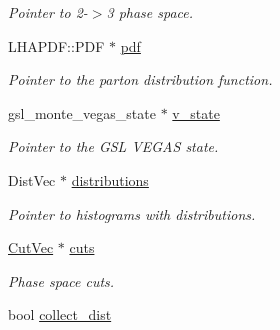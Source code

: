 \begin{DoxyCompactItemize}
\begin{DoxyCompactList}\small\item\em Pointer to 2-\/$>$3 phase space. \end{DoxyCompactList}\item 
\hypertarget{classintegrand__par_a082dc10e0e72baedade3f46cfffa4c15}{}L\+H\+A\+P\+D\+F\+::\+P\+D\+F $\ast$ \hyperlink{classintegrand__par_a082dc10e0e72baedade3f46cfffa4c15}{pdf}\label{classintegrand__par_a082dc10e0e72baedade3f46cfffa4c15}

\begin{DoxyCompactList}\small\item\em Pointer to the parton distribution function. \end{DoxyCompactList}\item 
\hypertarget{classintegrand__par_a3b5e2c8a2f3c33f0ebc594fd8f42210e}{}gsl\+\_\+monte\+\_\+vegas\+\_\+state $\ast$ \hyperlink{classintegrand__par_a3b5e2c8a2f3c33f0ebc594fd8f42210e}{v\+\_\+state}\label{classintegrand__par_a3b5e2c8a2f3c33f0ebc594fd8f42210e}

\begin{DoxyCompactList}\small\item\em Pointer to the G\+S\+L V\+E\+G\+A\+S state. \end{DoxyCompactList}\item 
\hypertarget{classintegrand__par_acd322d49688d798e5f71eb9ea63a4d46}{}Dist\+Vec $\ast$ \hyperlink{classintegrand__par_acd322d49688d798e5f71eb9ea63a4d46}{distributions}\label{classintegrand__par_acd322d49688d798e5f71eb9ea63a4d46}

\begin{DoxyCompactList}\small\item\em Pointer to histograms with distributions. \end{DoxyCompactList}\item 
\hypertarget{classintegrand__par_abb97a8b27b46a93b15bcf175c2309b55}{}\hyperlink{Cuts_8h_a61e538752de0e89c62ff420ec568e582}{Cut\+Vec} $\ast$ \hyperlink{classintegrand__par_abb97a8b27b46a93b15bcf175c2309b55}{cuts}\label{classintegrand__par_abb97a8b27b46a93b15bcf175c2309b55}

\begin{DoxyCompactList}\small\item\em Phase space cuts. \end{DoxyCompactList}\item 
\hypertarget{classintegrand__par_a2227f484c28e54b55769b2fe6911a782}{}bool \hyperlink{classintegrand__par_a2227f484c28e54b55769b2fe6911a782}{collect\+\_\+dist}\label{classintegrand__par_a2227f484c28e54b55769b2fe6911a782}


\end{DoxyCompactItemize}
